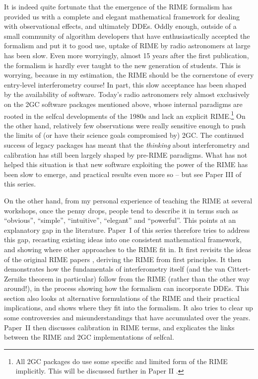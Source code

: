 \documentclass{aa}
\begin{document}
It is indeed quite fortunate that the emergence of the RIME formalism has provided us with a complete and elegant mathematical framework for dealing with observational effects, and ultimately DDEs. Oddly enough, outside of a small community of algorithm developers that have enthusiastically accepted the formalism and put it to good use, uptake of RIME by radio astronomers at large has been slow. Even more worryingly, almost 15 years after the first publication, the formalism is hardly ever taught to the new generation of students. This is worrying, because in my estimation, the RIME should be the cornerstone of every entry-level interferometry course! In part, this slow acceptance has been shaped by the availability of software. Today's radio astronomers rely almost exclusively on the 2GC software packages mentioned above, whose internal paradigms are rooted in the selfcal developments of the 1980s and lack an explicit RIME.\footnote{All 2GC packages do use some specific and limited form of the RIME implicitly. This will be discussed further in Paper II \citep{RRIME2}.} On the other hand, relatively few observations were really sensitive enough to push the limits of (or have their science goals compromised by) 2GC. The continued success of legacy packages has meant that the {\em thinking} about interferometry and calibration has still been largely shaped by pre-RIME paradigms. What has not helped this situation is that new software exploiting the power of the RIME has been slow to emerge, and practical results even more so -- but see Paper III \citep{RRIME3} of this series.  

On the other hand, from my personal experience of teaching the RIME at several workshops, once the penny drops, people tend to describe it in terms such as ``obvious'', ``simple'', ``intuitive'', ``elegant'' and ``powerful''. This points at an explanatory gap in the literature. Paper~I of this series therefore tries to address this gap, recasting existing ideas into one consistent mathematical framework, and showing where other approaches to the RIME fit in. It first revisits the ideas of the original RIME papers \citep{ME1,ME4}, deriving the RIME from first principles. It then demonstrates how the fundamentals of interferometry itself (and the van Cittert-Zernike theorem in particular) follow from the RIME (rather than the other way around!), in the process showing how the formalism can incorporate DDEs. This section also looks at alternative formulations of the RIME and their practical implications, and shows where they fit into the formalism. It also tries to clear up some controversies and misunderstandings that have accumulated over the years. Paper~II \citep{RRIME2} then discusses calibration in RIME terms, and explicates the links between the RIME and 2GC implementations of selfcal. 
\end{document}
